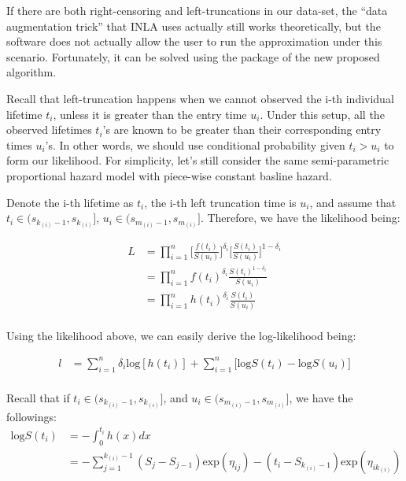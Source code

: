 \documentclass[]{article}
\begin{document}
If there are both right-censoring and left-truncations in our data-set,
the ``data augmentation trick'' that INLA uses actually still works
theoretically, but the software does not actually allow the user to run
the approximation under this scenario. Fortunately, it can be solved
using the package of the new proposed algorithm.

Recall that left-truncation happens when we cannot observed the i-th
individual lifetime \(t_i\), unless it is greater than the entry time
\(u_i\). Under this setup, all the observed lifetimes \(t_i\)'s are
known to be greater than their corresponding entry times \(u_i\)'s. In
other words, we should use conditional probability given \(t_i > u_i\)
to form our likelihood. For simplicity, let's still consider the same
semi-parametric proportional hazard model with piece-wise constant
basline hazard.

Denote the i-th lifetime as \(t_i\), the i-th left truncation time is
\(u_i\), and assume that \(t_i \in (s_{k_{(i)}-1},s_{k_{(i)}}]\),
\(u_i \in (s_{m_{(i)}-1},s_{m_{(i)}}]\). Therefore, we have the
likelihood being:

\begin{equation}\begin{aligned}\label{eqn:lt}
L &= \prod_{i=1}^{n} {\bigg[\frac{f(t_i)}{S(u_i)}\bigg]^{\delta_i}\bigg[\frac{S(t_i)}{S(u_i)}\bigg]^{1- \delta_i}} \\
  &= \prod_{i=1}^{n} {f(t_i)^{\delta_i}}{\frac{S(t_i)^{1-\delta_i}}{S(u_i)}} \\
  &= \prod_{i=1}^{n} {h(t_i)^{\delta_i}}{\frac{S(t_i)}{S(u_i)}} \\
\end{aligned}\end{equation}

Using the likelihood above, we can easily derive the log-likelihood
being:

\begin{equation}\begin{aligned}\label{eqn:lt_log}
l &= \sum_{i=1}^{n} {{\delta_i}\text{log}[h(t_i)]} + \sum_{i=1}^{n} {\big[\text{log}S(t_i)-\text{log}S(u_i)\big]}  \\
\end{aligned}\end{equation}

Recall that if \(t_i \in (s_{k_{(i)}-1},s_{k_{(i)}}]\), and
\(u_i \in (s_{m_{(i)}-1},s_{m_{(i)}}]\), we have the followings:
\begin{equation}\begin{aligned}\label{eqn:ltcase1}
\text{log}S(t_i) &= -\int_{0}^{t_i} h(x) dx \\
                 &= -\sum_{j=1}^{k_{(i)}-1} (S_j-S_{j-1})\text{exp}(\eta_{ij})-(t_i-S_{k_{(i)}-1})\text{exp}(\eta_{ik_{(i)}}) \\
\end{aligned}\end{equation}
\end{document}

